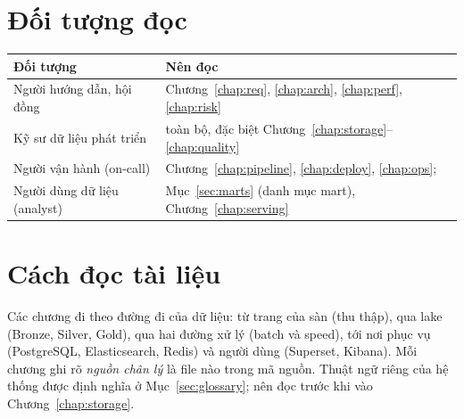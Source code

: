\section{Đối tượng đọc}
\begin{xltabular}{\linewidth}{@{}L{40mm}Y@{}}
  \toprule
  \textbf{Đối tượng} & \textbf{Nên đọc} \\
  \midrule
  Người hướng dẫn, hội đồng & Chương~\ref{chap:req}, \ref{chap:arch}, \ref{chap:perf}, \ref{chap:risk} \\
  Kỹ sư dữ liệu phát triển & toàn bộ, đặc biệt Chương~\ref{chap:storage}--\ref{chap:quality} \\
  Người vận hành (on-call) & Chương~\ref{chap:pipeline}, \ref{chap:deploy}, \ref{chap:ops};  \\
  Người dùng dữ liệu (analyst) & Mục~\ref{sec:marts} (danh mục mart), Chương~\ref{chap:serving} \\
  \bottomrule
\end{xltabular}

\section{Cách đọc tài liệu}
Các chương đi theo đường đi của dữ liệu: từ trang của sàn (thu thập), qua lake (Bronze, Silver, Gold),
qua hai đường xử lý (batch và speed), tới nơi phục vụ (PostgreSQL, Elasticsearch, Redis) và người dùng
(Superset, Kibana). Mỗi chương ghi rõ \emph{nguồn chân lý} là file nào trong mã nguồn.
Thuật ngữ riêng của hệ thống được định nghĩa ở Mục~\ref{sec:glossary}; nên đọc trước khi vào Chương~\ref{chap:storage}.

